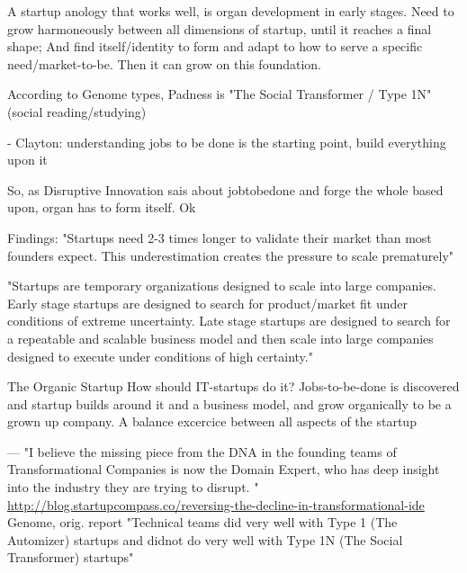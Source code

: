 \documentclass[a4paper,10pt]{article}
\begin{document}
 
 
A startup anology that works well, is organ development in early stages. 
Need to grow harmoneously between all dimensions of startup, until it reaches a final shape;
And find itself/identity to form and adapt to how to serve a specific need/market-to-be.
Then it can grow on this foundation.

According to Genome types, Padness is "The Social Transformer / Type 1N" (social reading/studying)

 - Clayton: understanding jobs to be done is the starting point, build everything upon it \cite{reinvetingBusinessModel}

So, as Disruptive Innovation sais about jobtobedone and forge the whole based upon, organ has to form itself. Ok

Findings:
"Startups need 2-3 times longer to validate their market than most founders
expect. This underestimation creates the pressure to scale prematurely"

"Startups are temporary organizations designed to scale into large companies.
Early stage startups are designed to search for product/market fit under
conditions of extreme uncertainty. Late stage startups are designed to search for
a repeatable and scalable business model and then scale into large companies
designed to execute under conditions of high certainty."

The Organic Startup
 How should IT-startups do it? Jobs-to-be-done is discovered and startup builds around it and a business model, and grow organically
 to be a grown up company.
 A balance excercice between all aspects of the startup
 
 
 ---
 "I believe the missing piece from the DNA in the founding teams of 
  Transformational Companies is now the Domain Expert, 
  who has deep insight into the industry they are trying to disrupt. "
 \url{http://blog.startupcompass.co/reversing-the-decline-in-transformational-ide}\\

 Genome, orig. report
 "Technical teams did very well with Type 1 (The Automizer) startups and didnot do very well with Type 1N (The Social Transformer) startups"
 
\end{document}
